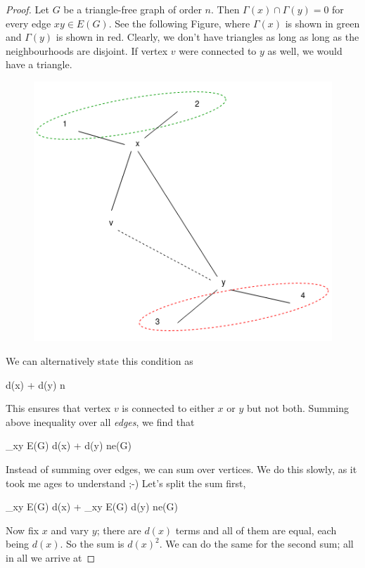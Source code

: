 \begin{proof}
  Let $G$ be a triangle-free graph of order $n$. Then $\Gamma(x) \cap \Gamma(y) = 0$ for every edge $xy \in E(G)$. See the following Figure, where $\Gamma(x)$ is shown in green and $\Gamma(y)$ is shown in red. Clearly, we don't have triangles as long as long as the neighbourhoods are disjoint. If vertex $v$ were connected to $y$ as well, we would have a triangle.

  \begin{figure}[H]
    \centering
    \includegraphics[scale=0.5]{images/graphs_03_03.png}
  \end{figure}
  
  We can alternatively state this condition as
  
  \bee
  d(x) + d(y) \leq n
  \eee

  This ensures that vertex $v$ is connected to either $x$ or $y$ but not both. Summing above inequality over all \emph{edges}, we find that

  \bee
  \sum_{xy \in E(G)} d(x) + d(y) \leq ne(G)
  \eee

  Instead of summing over edges, we can sum over vertices. We do this slowly, as it took me ages to understand ;-) Let's split the sum first,
  
  \bee
  \sum_{xy \in E(G)} d(x) + \sum_{xy \in E(G)} d(y) \leq ne(G)
  \eee

  Now fix $x$ and vary $y$; there are $d(x)$ terms and all of them are equal, each being $d(x)$. So the sum is $d(x)^2$. We can do the same for the second sum; all in all we arrive at


\end{proof}
